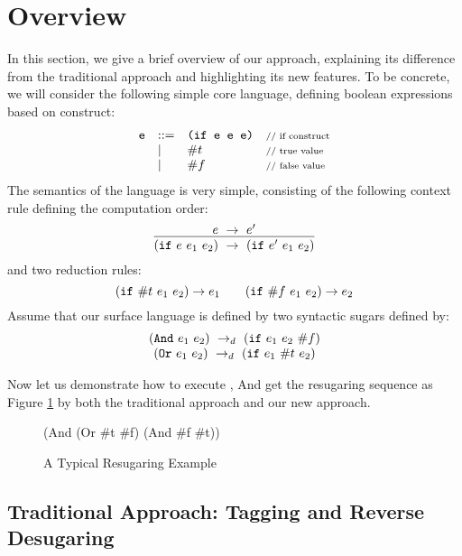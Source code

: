 \section{Overview}
\label{sec2}

In this section, we give a brief overview of our approach, explaining its difference from the traditional approach and highlighting its new features. To be concrete, we will consider the following simple core language, defining boolean expressions based on  construct:
\[
\begin{array}{lllll}
\mbox{\tt e} &::=& \texttt{(if~e~e~e)} &\mbox{{\scriptsize // if construct}}\\
& |& \#t  & \mbox{{\scriptsize // true value}}\\
& |& \#f & \mbox{{\scriptsize // false value}}
\end{array}
\]
The semantics of the language is very simple, consisting of the following context rule defining the computation order:
\[
\centering
\infer
{(\m{if}~e~e_1~e_2)~\rightarrow~(\m{if}~e'~e_1~e_2)}
{e~\rightarrow~e'}
\]
and two reduction rules:
\[
\centering
(\m{if}~\#t~e_1~e_2) \rightarrow e_1 \qquad (\m{if}~\#f~e_1~e_2) \rightarrow e_2
\]
Assume that our surface language is defined by two syntactic sugars defined by:
\[
\begin{array}{c}
(\mbox{\tt And}~e_1~e_2) ~\rightarrow_d~ (\mbox{\tt if}~e_1~e_2~\#f)\\
(\mbox{\tt Or}~e_1~e_2) ~\rightarrow_d~ (\mbox{\tt if}~e_1~\#t~e_2)
\end{array}
\]


Now let us demonstrate how to execute , And get the resugaring sequence as Figure \ref{fig:standard} by both the traditional approach and our new approach.

\begin{figure}[t]
\begin{center}
\begin{minipage}{6cm}
\begin{Codes}
    (And (Or \#t \#f) (And \#f \#t))
\end{Codes}
\end{minipage}
\end{center}
\caption{A Typical Resugaring Example}
\label{fig:standard}
\end{figure}




\subsection{Traditional Approach: Tagging and Reverse Desugaring}

